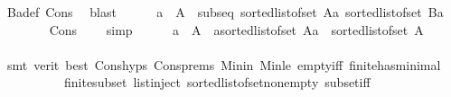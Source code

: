 \begin{isabellebody}
\ Ba{\isacharunderscore}{\kern0pt}def\ Cons{\isacharparenleft}{\kern0pt}{}{\isacharparenright}{\kern0pt}\ \isamarkupfalse%
\ blast\isanewline
\ \ \ \ \isamarkupfalse%
\ {}{\isacharcolon}{\kern0pt}{\isachardoublequoteopen}a\ {\isasymin}\ A\ {\isasymLongrightarrow}\ subseq\ {\isacharparenleft}{\kern0pt}sorted{\isacharunderscore}{\kern0pt}list{\isacharunderscore}{\kern0pt}of{\isacharunderscore}{\kern0pt}set\ {\isacharparenleft}{\kern0pt}A{\isacharminus}{\kern0pt}{\isacharbraceleft}{\kern0pt}a{\isacharbraceright}{\kern0pt}{\isacharparenright}{\kern0pt}{\isacharparenright}{\kern0pt}\ {\isacharparenleft}{\kern0pt}sorted{\isacharunderscore}{\kern0pt}list{\isacharunderscore}{\kern0pt}of{\isacharunderscore}{\kern0pt}set\ Ba{\isacharparenright}{\kern0pt}{\isachardoublequoteclose}\isanewline
\ \ \ \ \ \ \isamarkupfalse%
\ Cons\ {}\ {}\ \isamarkupfalse%
\ simp\isanewline
\ \ \ \ \isamarkupfalse%
\ {}{\isacharcolon}{\kern0pt}{\isachardoublequoteopen}a\ {\isasymin}\ A\ {\isasymLongrightarrow}\ a{\isacharhash}{\kern0pt}{\isacharparenleft}{\kern0pt}sorted{\isacharunderscore}{\kern0pt}list{\isacharunderscore}{\kern0pt}of{\isacharunderscore}{\kern0pt}set\ {\isacharparenleft}{\kern0pt}A{\isacharminus}{\kern0pt}{\isacharbraceleft}{\kern0pt}a{\isacharbraceright}{\kern0pt}{\isacharparenright}{\kern0pt}{\isacharparenright}{\kern0pt}\ {\isacharequal}{\kern0pt}\ sorted{\isacharunderscore}{\kern0pt}list{\isacharunderscore}{\kern0pt}of{\isacharunderscore}{\kern0pt}set\ A{\isachardoublequoteclose}\isanewline
\ \ \ \ \ \ \isamarkupfalse%
\ {\isacharparenleft}{\kern0pt}smt\ {\isacharparenleft}{\kern0pt}verit{\isacharcomma}{\kern0pt}\ best{\isacharparenright}{\kern0pt}\ Cons{\isachardot}{\kern0pt}hyps{\isacharparenleft}{\kern0pt}{}{\isacharparenright}{\kern0pt}\ Cons{\isachardot}{\kern0pt}prems{\isacharparenleft}{\kern0pt}{}{\isacharcomma}{\kern0pt}{}{\isacharparenright}{\kern0pt}\ Min{\isacharunderscore}{\kern0pt}in\ Min{\isacharunderscore}{\kern0pt}le\ empty{\isacharunderscore}{\kern0pt}iff\ finite{\isacharunderscore}{\kern0pt}has{\isacharunderscore}{\kern0pt}minimal{}\ \isanewline
\ \ \ \ \ \ \ \ \ \ finite{\isacharunderscore}{\kern0pt}subset\ list{\isachardot}{\kern0pt}inject\ sorted{\isacharunderscore}{\kern0pt}list{\isacharunderscore}{\kern0pt}of{\isacharunderscore}{\kern0pt}set{\isacharunderscore}{\kern0pt}nonempty\ subset{\isacharunderscore}{\kern0pt}iff{\isacharparenright}{\kern0pt}\isanewline

\end{isabellebody}
